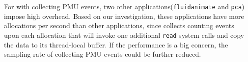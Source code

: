 For \MP{} with collecting PMU events, two other applications(\texttt{fluidanimate} and \texttt{pca}) impose high overhead. Based on our investigation, these applications have more allocations per second than other applications, since \MP{} collects counting events upon each allocation that will invoke one additional \texttt{read{}} system calls and copy the data to its thread-local buffer. If the performance is a big concern, the sampling rate of collecting PMU events could be further reduced. 





